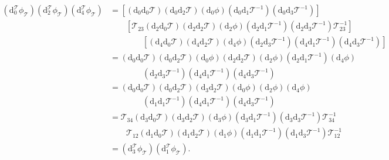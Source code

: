 \documentclass[reqno]{amsart}
\theoremstyle{definition}
\theoremstyle{remark}
\begin{document}
    \begin{equation}
        \begin{split}
            \left(\text{d}^\mathcal{T}_0 \phi_\mathcal{T}\right)\left(\text{d}^\mathcal{T}_2 \phi_\mathcal{T}\right)\left(\text{d}^\mathcal{T}_4 \phi_\mathcal{T}\right)&=\left[\left(\text{d}_0\text{d}_0 \mathcal{T}\right)\left(\text{d}_0\text{d}_2 \mathcal{T}\right)\left(\text{d}_0 \phi\right)\left(\text{d}_0\text{d}_1 \mathcal{T}^{-1}\right)\left(\text{d}_0\text{d}_3 \mathcal{T}^{-1}\right)\right]\\
            &\qquad \left[\mathcal{T}_{23}\left(\text{d}_2\text{d}_0 \mathcal{T}\right)\left(\text{d}_2\text{d}_2 \mathcal{T}\right)\left(\text{d}_2 \phi\right)\left(\text{d}_2\text{d}_1 \mathcal{T}^{-1}\right)\left(\text{d}_2\text{d}_3 \mathcal{T}^{-1}\right)\mathcal{T}_{23}^{-1}\right]\\
            &\qquad\qquad \left[ \left(\text{d}_4\text{d}_0 \mathcal{T}\right)\left(\text{d}_4\text{d}_2 \mathcal{T}\right)\left(\text{d}_4\phi\right)\left(\text{d}_2\text{d}_3 \mathcal{T}^{-1}\right)\left(\text{d}_4\text{d}_1 \mathcal{T}^{-1}\right)\left(\text{d}_4\text{d}_3 \mathcal{T}^{-1}\right) \right]\\
            &=\left(\text{d}_0\text{d}_0 \mathcal{T}\right)\left(\text{d}_0\text{d}_2 \mathcal{T}\right)\left(\text{d}_0 \phi\right)\left(\text{d}_2\text{d}_2 \mathcal{T}\right)\left(\text{d}_2 \phi\right)\left(\text{d}_2\text{d}_1 \mathcal{T}^{-1}\right)
            \left(\text{d}_4\phi\right)\\
            &\qquad\qquad\left(\text{d}_2\text{d}_3 \mathcal{T}^{-1}\right)\left(\text{d}_4\text{d}_1 \mathcal{T}^{-1}\right)\left(\text{d}_4\text{d}_3 \mathcal{T}^{-1}\right)\\
            &=\left(\text{d}_0\text{d}_0 \mathcal{T}\right)\left(\text{d}_0\text{d}_2 \mathcal{T}\right)\left(\text{d}_3\text{d}_2 \mathcal{T}\right)\left(\text{d}_0\phi\right)\left(\text{d}_2\phi\right)\left(\text{d}_4\phi\right)\\
            &\qquad\qquad\left(\text{d}_1\text{d}_1 \mathcal{T}^{-1}\right)\left(\text{d}_4\text{d}_1 \mathcal{T}^{-1}\right)\left(\text{d}_4\text{d}_3 \mathcal{T}^{-1}\right)\\
            &=\mathcal{T}_{34}\left(\text{d}_3\text{d}_0 \mathcal{T}\right)\left(\text{d}_3\text{d}_2 \mathcal{T}\right)\left(\text{d}_3\phi\right)\left(\text{d}_3\text{d}_1 \mathcal{T}^{-1}\right)\left(\text{d}_3\text{d}_3 \mathcal{T}^{-1}\right)\mathcal{T}_{34}^{-1}\\
            &\qquad \mathcal{T}_{12}\left(\text{d}_1\text{d}_0 \mathcal{T}\right)\left(\text{d}_1\text{d}_2 \mathcal{T}\right)\left(\text{d}_1\phi\right)\left(\text{d}_1\text{d}_1 \mathcal{T}^{-1}\right)\left(\text{d}_1\text{d}_3 \mathcal{T}^{-1}\right)\mathcal{T}_{12}^{-1}\\
            &=\left(\text{d}_3^\mathcal{T}\phi_\mathcal{T}\right)\left(\text{d}_1^\mathcal{T}\phi_\mathcal{T}\right).
        \end{split}
    \end{equation}
\end{document}
